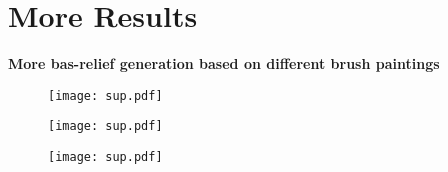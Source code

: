 \section{More Results}
\textbf{More bas-relief generation based on different brush paintings}

\begin{figure}[H]
	\centering
	\texttt{[image: sup.pdf]}
\end{figure}

\begin{figure}
	\centering
	\texttt{[image: sup.pdf]}
\end{figure}
\begin{figure}
	\centering
	\texttt{[image: sup.pdf]}
\end{figure}

